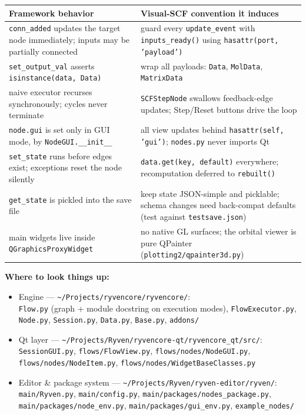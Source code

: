 \documentclass[10pt,a4paper]{article}
\newcommand{\code}[1]{\texttt{\small #1}}
\begin{document}
\begin{center}
\small
\begin{tabular}{@{}p{}p{}@{}}
\toprule
\textbf{Framework behavior} & \textbf{Visual-SCF convention it induces}\\
\midrule
\code{conn\_added} updates the target node immediately; inputs may be partially connected
& guard every \code{update\_event} with \code{inputs\_ready()} using
  \code{hasattr(port, 'payload')}\\[3pt]
\code{set\_output\_val} asserts \code{isinstance(data, Data)}
& wrap all payloads: \code{Data}, \code{MolData}, \code{MatrixData}\\[3pt]
naive executor recurses synchronously; cycles never terminate
& \code{SCFStepNode} swallows feedback-edge updates; Step/Reset buttons drive the loop\\[3pt]
\code{node.gui} is set only in GUI mode, by \code{NodeGUI.\_\_init\_\_}
& all view updates behind \code{hasattr(self, 'gui')}; \code{nodes.py} never imports Qt\\[3pt]
\code{set\_state} runs before edges exist; exceptions reset the node silently
& \code{data.get(key, default)} everywhere; recomputation deferred to \code{rebuilt()}\\[3pt]
\code{get\_state} is pickled into the save file
& keep state JSON-simple and picklable; schema changes need back-compat defaults
  (test against \code{testsave.json})\\[3pt]
main widgets live inside \code{QGraphicsProxyWidget}
& no native GL surfaces; the orbital viewer is pure QPainter
  (\code{plotting2/qpainter3d.py})\\
\bottomrule
\end{tabular}
\end{center}

\vspace{6pt}
\textbf{Where to look things up:}

\begin{itemize}\raggedright
\item Engine --- \code{\textasciitilde/Projects/ryvencore/ryvencore/}:\\
      \code{Flow.py} (graph + module docstring on execution modes),
      \code{FlowExecutor.py}, \code{Node.py},
      \code{Session.py}, \code{Data.py}, \code{Base.py}, \code{addons/}
\item Qt layer --- \code{\textasciitilde/Projects/Ryven/ryvencore-qt/ryvencore\_qt/src/}:\\
      \code{SessionGUI.py}, \code{flows/FlowView.py},
      \code{flows/nodes/NodeGUI.py},\\
      \code{flows/nodes/NodeItem.py},
      \code{flows/nodes/WidgetBaseClasses.py}
\item Editor \& package system --- \code{\textasciitilde/Projects/Ryven/ryven-editor/ryven/}:\\
      \code{main/Ryven.py}, \code{main/config.py},
      \code{main/packages/nodes\_package.py},\\
      \code{main/packages/node\_env.py},
      \code{main/packages/gui\_env.py}, \code{example\_nodes/}
\end{itemize}
\end{document}
